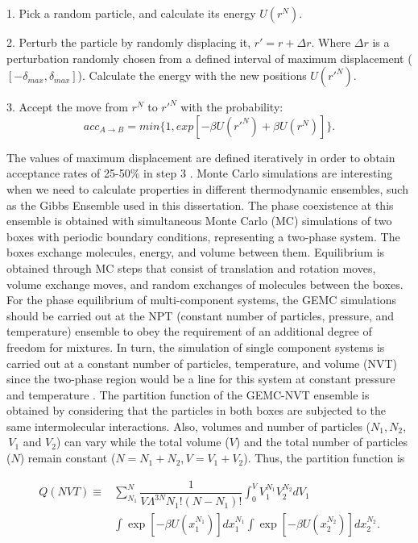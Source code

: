 1. Pick a random particle, and calculate its energy $U(r^{N})$.

2. Perturb the particle by randomly displacing  it, $r' = r +\Delta r$. Where $\Delta r$ is a perturbation randomly chosen from a defined interval of maximum displacement ($[- \delta _{max},\delta _{max}]$). Calculate the energy with the new positions $U(r'^{N})$.

3. Accept the move from $r^{N}$ to $r'^{N}$ with the probability:
\begin{equation}
acc_{A \rightarrow B} = min \lbrace 1,exp[-\beta U(r'^{N}) + \beta U(r^{N}) ] \rbrace .
\end{equation}

The values of maximum displacement are defined iteratively in order to obtain acceptance rates of 25-50\% in step 3   \cite{Frenkel2013}. Monte Carlo simulations are interesting when we need to calculate properties in different thermodynamic ensembles, such as the Gibbs Ensemble used in this dissertation. The phase coexistence at this ensemble is obtained with simultaneous Monte Carlo (MC) simulations of two boxes with periodic boundary conditions, representing a two-phase system. The boxes exchange molecules, energy, and volume between them. Equilibrium is obtained through MC steps that consist of translation and rotation moves, volume exchange moves, and random exchanges of molecules between the boxes. For the phase equilibrium of multi-component systems, the GEMC simulations should be carried out at the NPT (constant number of particles, pressure, and temperature) ensemble to obey the requirement of an additional degree of freedom for mixtures. In turn, the simulation of single component systems is carried out at a constant number of particles, temperature, and volume (NVT) since the two-phase region would be a line for this system at constant pressure and temperature \cite{frenkel}. The partition function of the GEMC-NVT ensemble is obtained by considering that the particles in both boxes are subjected to the same intermolecular interactions. Also, volumes and number of particles ($N_{1}$,$\, N_{2}$,$\, V_{1}$ and $V_{2}$) can vary while the total volume ($V$) and the total number of particles ($N$) remain constant ($N = N_{1} + N_{2}$,$\, V = V_{1} + V_{2}$). Thus, the partition function is

\begin{equation}
\begin{aligned}
Q(NVT) {} \equiv & \sum_{N_{1}}^{N} \dfrac{1}{V \Lambda ^{3N} N_{1}!(N-N_{1})!} \int_{0}^{V} V_{1}^{N_{1}} V_{2}^{N_{2}} dV_{1} \\
& \int  \exp[-\beta U(x_{1}^{N_{1}})] dx_{1}^{N_{1}} \int  \exp[-\beta U(x_{2}^{N_{2}})] dx_{2}^{N_{2}}.
\end{aligned}
\label{eqn:gepart}
\end{equation}

